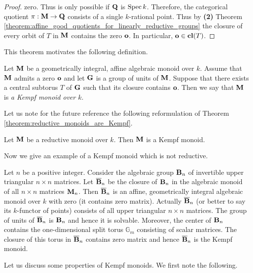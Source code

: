 \begin{proof}
zero. Thus is only possible if $\mathbf{Q}$ is $\mathrm{Spec}\, k$. Therefore, the categorical quotient $\pi:\mathbf{M}\rightarrow \mathbf{Q}$ consists of a single $k$-rational point. Thus by \textbf{(2)} Theorem \ref{theorem:affine_good_quotients_for_linearly_reductive_groups} the closure of every orbit of $T$ in $\mathbf{M}$ contains the zero $\mathbf{o}$. In particular, $\mathbf{o}\in \mathbf{cl}(T)$.
\end{proof}
\noindent
This theorem motivates the following definition.

\begin{definition}
Let $\mathbf{M}$ be a geometrically integral, affine algebraic monoid over $k$. Assume that $\mathbf{M}$ admits a zero $\mathbf{o}$ and let $\mathbf{G}$ is a group of units of $\mathbf{M}$. Suppose that there exists a central subtorus $T$ of $\mathbf{G}$ such that its closure contains $\mathbf{o}$. Then we say that $\mathbf{M}$ is \textit{a Kempf monoid over $k$}.
\end{definition}
\noindent
Let us note for the future reference the following reformulation of Theorem \ref{theorem:reductive_monoids_are_Kempf}.

\begin{corollary}\label{corollary:reductive_monoids_are_Kempf}
Let $\mathbf{M}$ be a reductive monoid over $k$. Then $\mathbf{M}$ is a Kempf monoid.
\end{corollary}
\noindent
Now we give an example of a Kempf monoid which is not reductive.

\begin{example}\label{example:nonreductive_Kempf_monoid}
Let $n$ be a positive integer. Consider the algebraic group $\mathbf{B}_n$ of invertible upper triangular $n\times n$ matrices. Let $\overline{\mathbf{B}}_n$ be the closure of $\mathbf{B}_n$ in the algebraic monoid of all $n\times n$ matrices $\mathbf{M}_n$. Then $\overline{\mathbf{B}}_n$ is an affine, geometrically integral algebraic monoid over $k$ with zero (it contains zero matrix). Actually $\overline{\mathbf{B}}_n$ (or better to say its $k$-functor of points) consists of all upper triangular $n\times n$ matrices. The group of units of $\overline{\mathbf{B}}_n$ is $\mathbf{B}_n$ and hence it is solvable. Moreover, the center of $\mathbf{B}_n$ contains the one-dimensional split torus $\mathbb{G}_{m}$ consisting of scalar matrices. The closure of this torus in $\overline{\mathbf{B}}_n$ contains zero matrix and hence $\overline{\mathbf{B}}_n$ is the Kempf monoid.
\end{example}
\noindent
Let us discuss some properties of Kempf monoids. We first note the following.

